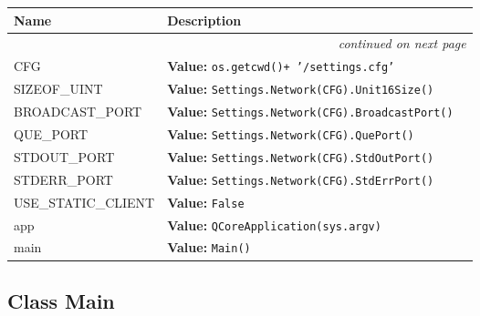     \vspace{-1cm}
\hspace{\varindent}\begin{longtable}{|p{\varnamewidth}|p{\vardescrwidth}|l}
\cline{1-2}
\cline{1-2} \centering \textbf{Name} & \centering \textbf{Description}& \\
\cline{1-2}
\endhead\cline{1-2}\multicolumn{3}{r}{\small\textit{continued on next page}}\\\endfoot\cline{1-2}
\endlastfoot\raggedright C\-F\-G\- & \raggedright \textbf{Value:} 
{\tt os.getcwd()+ '/settings.cfg'}&\\
\cline{1-2}
\raggedright S\-I\-Z\-E\-O\-F\-\_\-U\-I\-N\-T\-1\-6\- & \raggedright \textbf{Value:} 
{\tt Settings.Network(CFG).Unit16Size()}&\\
\cline{1-2}
\raggedright B\-R\-O\-A\-D\-C\-A\-S\-T\-\_\-P\-O\-R\-T\- & \raggedright \textbf{Value:} 
{\tt Settings.Network(CFG).BroadcastPort()}&\\
\cline{1-2}
\raggedright Q\-U\-E\-\_\-P\-O\-R\-T\- & \raggedright \textbf{Value:} 
{\tt Settings.Network(CFG).QuePort()}&\\
\cline{1-2}
\raggedright S\-T\-D\-O\-U\-T\-\_\-P\-O\-R\-T\- & \raggedright \textbf{Value:} 
{\tt Settings.Network(CFG).StdOutPort()}&\\
\cline{1-2}
\raggedright S\-T\-D\-E\-R\-R\-\_\-P\-O\-R\-T\- & \raggedright \textbf{Value:} 
{\tt Settings.Network(CFG).StdErrPort()}&\\
\cline{1-2}
\raggedright U\-S\-E\-\_\-S\-T\-A\-T\-I\-C\-\_\-C\-L\-I\-E\-N\-T\- & \raggedright \textbf{Value:} 
{\tt False}&\\
\cline{1-2}
\raggedright a\-p\-p\- & \raggedright \textbf{Value:} 
{\tt QCoreApplication(sys.argv)}&\\
\cline{1-2}
\raggedright m\-a\-i\-n\- & \raggedright \textbf{Value:} 
{\tt Main()}&\\
\cline{1-2}
\end{longtable}



\subsection{Class Main}

